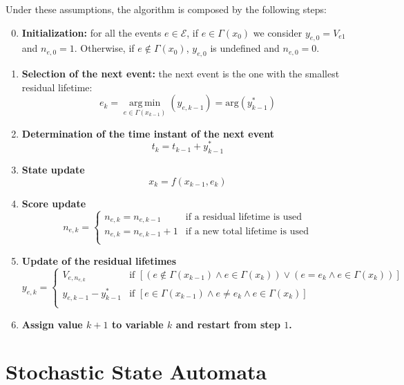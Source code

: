 \documentclass[12pt,a4paper]{article}
\DeclareMathOperator*{\argmin}{arg\,min}
\begin{document}
\newpage
\noindent
Under these assumptions, the algorithm is composed by the following steps:
\begin{enumerate}
\setcounter{enumi}{-1}
\item \textbf{Initialization: }	for all the events $e\in\mathcal{E}$, if $e\in\Gamma(x_0)$ we consider $y_{e,0}=V_{e1}$ and $n_{e,0}=1$. Otherwise, if $e\notin\Gamma(x_0)$, $y_{e,0}$ is undefined and $n_{e,0}=0$.
\item \textbf{Selection of the next event: } the next event is the one with the smallest residual lifetime:
$$
e_k = \argmin\limits_{e\in\Gamma(x_{k-1})} (y_{e,k-1}) = \text{arg} (y_{k-1}^*)
$$
\item \textbf{Determination of the time instant of the next event}
$$
t_k=t_{k-1}+y_{k-1}^*
$$
\item \textbf{State update}
$$
x_{k}=f(x_{k-1},e_{k})
$$
\item \textbf{Score update}
$$
n_{e,k}=
\begin{cases}
n_{e,k} = n_{e,k-1} & \text{if a residual lifetime is used} \\
n_{e,k} = n_{e,k-1}+1 & \text{if a new total lifetime is used} \\
\end{cases}
$$
\item \textbf{Update of the residual lifetimes}
$$
y_{e,k}=
\begin{cases}
V_{e,n_{e,k}} & \text{if } \left[\left(e\notin\Gamma(x_{k-1})\wedge e\in\Gamma(x_{k})\right)\vee\left(e=e_{k} \wedge e\in \Gamma(x_{k})\right)\right] \\
y_{e,k-1}-y_{k-1}^{*} & \text{if } \left[e\in\Gamma(x_{k-1})\wedge e\neq e_{k} \wedge e\in\Gamma(x_{k}) \right] \\
\end{cases}
$$
\item \textbf{Assign value $k+1$ to variable $k$ and restart from step $1$.}
\end{enumerate}
\newpage
\section{Stochastic State Automata}
\end{document}
